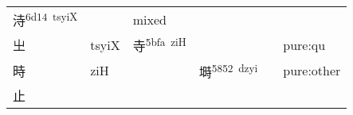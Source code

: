 \documentclass[14pt,a4paper]{scrartcl}
\begin{document}
\begin{longtable}[c]{@{}llllll@{}}
\begin{minipage}[t]{0.14\columnwidth}
洔\textsuperscript{6d14~tsyiX}
\strut\end{minipage} &
\begin{minipage}[t]{0.14\columnwidth}\raggedright\strut
\strut\end{minipage} &
\begin{minipage}[t]{0.14\columnwidth}\raggedright\strut
mixed
\strut\end{minipage}\tabularnewline
\begin{minipage}[t]{0.14\columnwidth}\raggedright\strut
㞢
\strut\end{minipage} &
\begin{minipage}[t]{0.14\columnwidth}\raggedright\strut
tsyiX
\strut\end{minipage} &
\begin{minipage}[t]{0.14\columnwidth}\raggedright\strut
寺\textsuperscript{5bfa~ziH}
\strut\end{minipage} &
\begin{minipage}[t]{0.14\columnwidth}\raggedright\strut
\strut\end{minipage} &
\begin{minipage}[t]{0.14\columnwidth}\raggedright\strut
\strut\end{minipage} &
\begin{minipage}[t]{0.14\columnwidth}\raggedright\strut
pure:qu
\strut\end{minipage}\tabularnewline
\begin{minipage}[t]{0.14\columnwidth}\raggedright\strut
時
\strut\end{minipage} &
\begin{minipage}[t]{0.14\columnwidth}\raggedright\strut
ziH
\strut\end{minipage} &
\begin{minipage}[t]{0.14\columnwidth}\raggedright\strut
\strut\end{minipage} &
\begin{minipage}[t]{0.14\columnwidth}\raggedright\strut
塒\textsuperscript{5852~dzyi}
\strut\end{minipage} &
\begin{minipage}[t]{0.14\columnwidth}\raggedright\strut
\strut\end{minipage} &
\begin{minipage}[t]{0.14\columnwidth}\raggedright\strut
pure:other
\strut\end{minipage}\tabularnewline
\begin{minipage}[t]{0.14\columnwidth}\raggedright\strut
止
\strut\end{minipage} &

\end{longtable}
\end{document}
